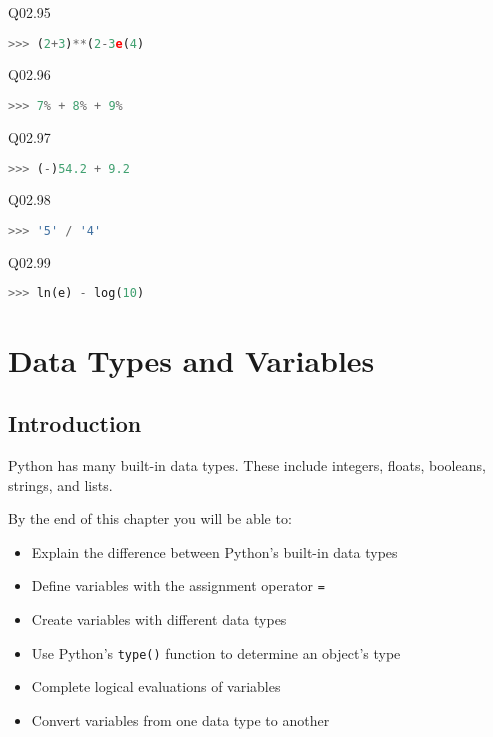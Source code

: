 \documentclass{book}
\newcommand{\passthrough}[1]{#1}
\begin{document}
Q02.95

\begin{lstlisting}[language=Python]
>>> (2+3)**(2-3e(4)
\end{lstlisting}

Q02.96

\begin{lstlisting}[language=Python]
>>> 7% + 8% + 9%
\end{lstlisting}

Q02.97

\begin{lstlisting}[language=Python]
>>> (-)54.2 + 9.2
\end{lstlisting}

Q02.98

\begin{lstlisting}[language=Python]
>>> '5' / '4'
\end{lstlisting}

Q02.99

\begin{lstlisting}[language=Python]
>>> ln(e) - log(10)
\end{lstlisting}
    




    
        \hypertarget{data-types-and-variables}{%
\chapter{Data Types and Variables}\label{data-types-and-variables}}
    




    
        \hypertarget{introduction}{%
\section{Introduction}\label{introduction}}
        \newpage

    




    
        Python has many built-in data types. These include integers, floats,
booleans, strings, and lists.

By the end of this chapter you will be able to:

\begin{itemize}
\item
  Explain the difference between Python's built-in data types
\item
  Define variables with the assignment operator
  \passthrough{\lstinline!=!}
\item
  Create variables with different data types
\item
  Use Python's \passthrough{\lstinline!type()!} function to determine an
  object's type
\item
  Complete logical evaluations of variables
\item
  Convert variables from one data type to another
\end{itemize}
        \newpage
\end{document}
